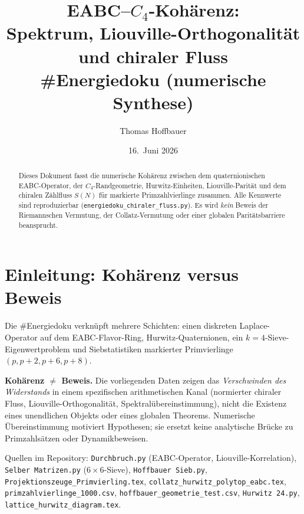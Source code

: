 \documentclass[12pt,a4paper]{article}
\title{EABC--$C_4$-Kohärenz:\\
  Spektrum, Liouville-Orthogonalität und chiraler Fluss\\
  \large \#Energiedoku (numerische Synthese)}
\author{Thomas Hoffbauer}
\date{16.\ Juni 2026}
\begin{document}
\maketitle

\begin{abstract}
Dieses Dokument fasst die numerische Kohärenz zwischen dem
quaternionischen EABC-Operator, der $C_4$-Randgeometrie,
Hurwitz-Einheiten, Liouville-Parität und dem chiralen
Zählfluss $S(N)$ für markierte Primzahlvierlinge zusammen.
Alle Kennwerte sind reproduzierbar (\texttt{energiedoku\_chiraler\_fluss.py}).
Es wird \emph{kein} Beweis der Riemannschen Vermutung, der Collatz-Vermutung
oder einer globalen Paritätsbarriere beansprucht.
\end{abstract}

\tableofcontents
\newpage

\section{Einleitung: Kohärenz versus Beweis}
\label{sec:einleitung}

Die \#Energiedoku verknüpft mehrere Schichten: einen diskreten
Laplace-Operator auf dem EABC-Flavor-Ring, Hurwitz-Quaternionen,
ein $k=4$-Sieve-Eigenwertproblem und Siebstatistiken markierter
Primvierlinge $(p,p+2,p+6,p+8)$.

\begin{tcolorbox}[epistemik,title={Epistemologische Leitlinie}]
\textbf{Kohärenz $\neq$ Beweis.}
Die vorliegenden Daten zeigen das \emph{Verschwinden des Widerstands}
in einem spezifischen arithmetischen Kanal (normierter chiraler Fluss,
Liouville-Orthogonalität, Spektralübereinstimmung), nicht die
Existenz eines unendlichen Objekts oder eines globalen Theorems.
Numerische Übereinstimmung motiviert Hypothesen; sie ersetzt keine
analytische Brücke zu Primzahlsätzen oder Dynamikbeweisen.
\end{tcolorbox}

Quellen im Repository:
\texttt{Durchbruch.py} (EABC-Operator, Liouville-Korrelation),
\texttt{Selber Matrizen.py} ($6\times 6$-Sieve),
\texttt{Hoffbauer Sieb.py},
\texttt{Projektionszeuge\_Primvierling.tex},
\texttt{collatz\_hurwitz\_polytop\_eabc.tex},
\texttt{primzahlvierlinge\_1000.csv},
\texttt{hoffbauer\_geometrie\_test.csv},
\texttt{Hurwitz 24.py},
\texttt{lattice\_hurwitz\_diagram.tex}.

\end{document}
